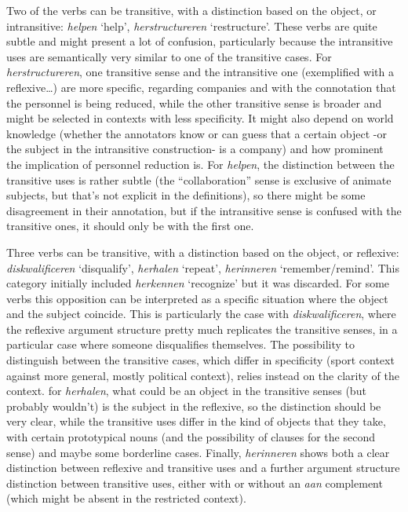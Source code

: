 \documentclass[
]{book}
\begin{document}
Two of the verbs can be transitive, with a distinction based on the object, or intransitive: \emph{helpen} `help', \emph{herstructureren} `restructure'.
These verbs are quite subtle and might present a lot of confusion, particularly because the intransitive uses are semantically very similar to one of the transitive cases.
For \emph{herstructureren}, one transitive sense and the intransitive one (exemplified with a reflexive\ldots) are more specific, regarding companies and with the connotation that the personnel is being reduced, while the other transitive sense is broader and might be selected in contexts with less specificity. It might also depend on world knowledge (whether the annotators know or can guess that a certain object -or the subject in the intransitive construction- is a company) and how prominent the implication of personnel reduction is.
For \emph{helpen}, the distinction between the transitive uses is rather subtle (the ``collaboration'' sense is exclusive of animate subjects, but that's not explicit in the definitions), so there might be some disagreement in their annotation, but if the intransitive sense is confused with the transitive ones, it should only be with the first one.

Three verbs can be transitive, with a distinction based on the object, or reflexive: \emph{diskwalificeren} `disqualify', \emph{herhalen} `repeat', \emph{herinneren} `remember/remind'. This category initially included \emph{herkennen} `recognize' but it was discarded.
For some verbs this opposition can be interpreted as a specific situation where the object and the subject coincide.
This is particularly the case with \emph{diskwalificeren}, where the reflexive argument structure pretty much replicates the transitive senses, in a particular case where someone disqualifies themselves. The possibility to distinguish between the transitive cases, which differ in specificity (sport context against more general, mostly political context), relies instead on the clarity of the context.
for \emph{herhalen}, what could be an object in the transitive senses (but probably wouldn't) is the subject in the reflexive, so the distinction should be very clear, while the transitive uses differ in the kind of objects that they take, with certain prototypical nouns (and the possibility of clauses for the second sense) and maybe some borderline cases.
Finally, \emph{herinneren} shows both a clear distinction between reflexive and transitive uses and a further argument structure distinction between transitive uses, either with or without an \emph{aan} complement (which might be absent in the restricted context).
\end{document}
